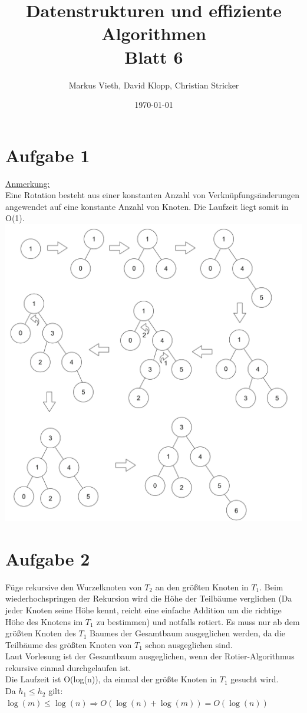 \documentclass[a4paper,11pt,twoside]{article}
\title{Datenstrukturen und effiziente Algorithmen\\ Blatt 6}
\author{Markus Vieth, David Klopp, Christian Stricker}
\date{\today}
\begin{document}
\maketitle
\cleardoublepage
\pagestyle{myheadings}

\section*{Aufgabe 1}
\underline{Anmerkung: }\\ Eine Rotation besteht aus einer konstanten Anzahl von Verknüpfungsänderungen angewendet auf eine konstante Anzahl von Knoten. Die Laufzeit liegt somit in O(1). \\
\includegraphics*[scale=0.2]{Images/Nr_1.png}

\section*{Aufgabe 2}
Füge rekursive den Wurzelknoten von $T_2$ an den größten Knoten in $T_1$. Beim wiederhochspringen der Rekursion wird die Höhe der Teilbäume verglichen (Da jeder Knoten seine Höhe kennt, reicht eine einfache Addition um die richtige Höhe des Knotens im $T_1$ zu bestimmen) und notfalls rotiert. Es muss nur ab dem größten Knoten des $T_1$ Baumes der Gesamtbaum ausgeglichen werden, da die Teilbäume des größten Knoten von $T_1$ schon ausgeglichen sind. \\
Laut Vorlesung ist der Gesamtbaum ausgeglichen, wenn der Rotier-Algorithmus rekursive einmal durchgelaufen ist. \\
Die Laufzeit ist O(log(n)), da einmal der größte Knoten in $T_1$ gesucht wird. \\
Da $h_1 \leq h_2$ gilt: $\log(m) \leq \log(n) \Rightarrow O(\log(n)+\log(m)) = O(\log(n)) $
\end{document}
